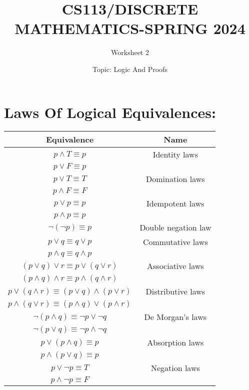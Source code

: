 \documentclass{exam}
\title{CS113/DISCRETE MATHEMATICS-SPRING 2024}
\author{Worksheet 2}
\date{Topic: Logic And Proofs}
\begin{document}
\maketitle

\begin{center}
\end{center}

\vspace{5mm}

\vspace{5mm}

\section{Laws Of Logical Equivalences: }
\vspace{5mm}
\begin{center}
\begin{table}[h]
\centering
\begin{tabular}{|c|c|}
\hline
Equivalence & Name \\
\hline
$p \land T \equiv p$ & Identity laws \\
$p \lor F \equiv p$ & \\
\hline
$p \lor T \equiv T$ & Domination laws \\
$p \land F \equiv F$ & \\
\hline
$p \lor p \equiv p$ & Idempotent laws \\
$p \land p \equiv p$ & \\
\hline
$\neg (\neg p) \equiv p$ & Double negation law \\
\hline
$p \lor q \equiv q \lor p$ & Commutative laws \\
$p \land q \equiv q \land p$ & \\
\hline
$(p \lor q) \lor r \equiv p \lor (q \lor r)$ & Associative laws \\
$(p \land q) \land r \equiv p \land (q \land r)$ & \\
\hline
$p \lor (q \land r) \equiv (p \lor q) \land (p \lor r)$ & Distributive laws \\
$p \land (q \lor r) \equiv (p \land q) \lor (p \land r)$ & \\
\hline
$\neg (p \land q) \equiv \neg p \lor \neg q$ & De Morgan’s laws \\
$\neg (p \lor q) \equiv \neg p \land \neg q$ & \\
\hline
$p \lor (p \land q) \equiv p$ & Absorption laws \\
$p \land (p \lor q) \equiv p$ & \\
\hline
$p \lor \neg p \equiv T$ & Negation laws \\
$p \land \neg p \equiv F$ & \\
\hline
\end{tabular}
\end{table}

\end{center}
\end{document}
